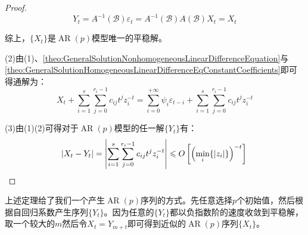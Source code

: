\begin{proof}
\begin{equation*}
		Y_t=A^{-1}(\mathcal{B})\varepsilon_t=A^{-1}(\mathcal{B})A(\mathcal{B})X_t=X_t
	\end{equation*}\par
	综上，$\{X_t\}$是$\operatorname{AR}(p)$模型唯一的平稳解。\par
	(2)由(1)、\cref{theo:GeneralSolutionNonhomogeneousLinearDifferenceEquation}与\cref{theo:GeneralSolutionHomogeneousLinearDifferenceEqConstantCoefficients}即可得通解为：
	\begin{equation*}
		X_t+\sum_{i=1}^{s}\sum_{j=0}^{r_i-1}c_{ij}t^{j}z_i^{-t}=\sum_{i=0}^{+\infty}\psi_i\varepsilon_{t-i}+\sum_{i=1}^{s}\sum_{j=0}^{r_i-1}c_{ij}t^{j}z_i^{-t}
	\end{equation*}\par
	(3)由(1)(2)可得对于$\operatorname{AR}(p)$模型的任一解$\{Y_t\}$有：
	\begin{equation*}
		|X_t-Y_t|=\left|\sum_{i=1}^{s}\sum_{j=0}^{r_i-1}c_{ij}t^{j}z_i^{-t}\right|\leqslant O\left[\left(\min_i\{|z_i|\}\right)^{-t}\right]\qedhere
	\end{equation*}
\end{proof}
\begin{note}
	上述定理给了我们一个产生$\operatorname{AR}(p)$序列的方式。先任意选择$p$个初始值，然后根据自回归系数产生序列$\{Y_t\}$。因为任意的$\{Y_t\}$都以负指数阶的速度收敛到平稳解，取一个较大的$m$然后令$X_t=Y_{m+t}$即可得到近似的$\operatorname{AR}(p)$序列$\{X_t\}$。
\end{note}
